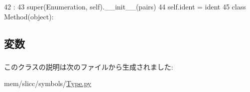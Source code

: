 \begin{DoxyCode}
42                                     :
43         super(Enumeration, self).__init__(pairs)
44         self.ident = ident
45 
class Method(object):
\end{DoxyCode}


\subsection{変数}
\hypertarget{classslicc_1_1symbols_1_1Type_1_1Enumeration_a2fe57e2d3d2cba9a3aeba2f629eaa78b}{
\subsubsection[{ident}]{}}
\label{classslicc_1_1symbols_1_1Type_1_1Enumeration_a2fe57e2d3d2cba9a3aeba2f629eaa78b}


このクラスの説明は次のファイルから生成されました:\begin{DoxyCompactItemize}
\item 
mem/slicc/symbols/\hyperlink{Type_8py}{Type.py}\end{DoxyCompactItemize}
